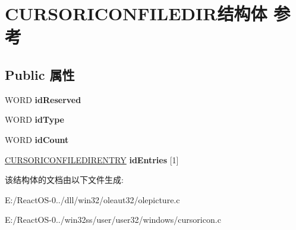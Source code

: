 \hypertarget{struct_c_u_r_s_o_r_i_c_o_n_f_i_l_e_d_i_r}{}\section{C\+U\+R\+S\+O\+R\+I\+C\+O\+N\+F\+I\+L\+E\+D\+I\+R结构体 参考}
\label{struct_c_u_r_s_o_r_i_c_o_n_f_i_l_e_d_i_r}
\subsection*{Public 属性}
\begin{DoxyCompactItemize}
\item 
\mbox{\label{struct_c_u_r_s_o_r_i_c_o_n_f_i_l_e_d_i_r_a4bbcb723e5163998326fd498d10b04c5}} 
W\+O\+RD {\bfseries id\+Reserved}
\item 
\mbox{\label{struct_c_u_r_s_o_r_i_c_o_n_f_i_l_e_d_i_r_a53774ffa2d27bd5aca80f0305da84014}} 
W\+O\+RD {\bfseries id\+Type}
\item 
\mbox{\label{struct_c_u_r_s_o_r_i_c_o_n_f_i_l_e_d_i_r_a634408d790b19597efec622b13d0b857}} 
W\+O\+RD {\bfseries id\+Count}
\item 
\mbox{\label{struct_c_u_r_s_o_r_i_c_o_n_f_i_l_e_d_i_r_a75e3f90a9aaacac7ff7620114acdcb95}} 
\hyperlink{struct_c_u_r_s_o_r_i_c_o_n_f_i_l_e_d_i_r_e_n_t_r_y}{C\+U\+R\+S\+O\+R\+I\+C\+O\+N\+F\+I\+L\+E\+D\+I\+R\+E\+N\+T\+RY} {\bfseries id\+Entries} \mbox{[}1\mbox{]}
\end{DoxyCompactItemize}


该结构体的文档由以下文件生成\+:\begin{DoxyCompactItemize}
\item 
E\+:/\+React\+O\+S-\/0../dll/win32/oleaut32/olepicture.\+c\item 
E\+:/\+React\+O\+S-\/0../win32ss/user/user32/windows/cursoricon.\+c\end{DoxyCompactItemize}

